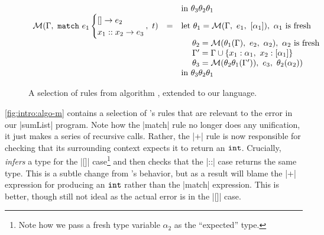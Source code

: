 \begin{figure}
\[{\begin{array}{lcl}
   &   & \text{in } \tsu_3\tsu_2\tsu_1 \\
\M(\Gamma,\ \elcase{e_1}{e_2}{x_1}{x_2}{e_3},\ t)
   & = & \text{let } \tsu_1 = \M(\Gamma,\ e_1,\ \tlist{\alpha_1}),\ \alpha_1 \text{ is fresh} \\
   &   & \quad\ \tsu_2 = \M(\tsu_1(\Gamma),\ e_2,\ \alpha_2),\ \alpha_2 \text{ is fresh} \\
   &   & \quad\ \Gamma' = \Gamma \cup \{x_1:\alpha_1,\ x_2:\tlist{\alpha_1}\} \\
   &   & \quad\ \tsu_3 = \M(\tsu_2\tsu_1(\Gamma')),\ e_3,\ \tsu_2(\alpha_2)) \\
   &   & \text{in } \tsu_3\tsu_2\tsu_1 \\
\end{array}
}
\]
\caption{A selection of rules from algorithm \M, extended to our language.}
\label{fig:intro:algo-m}
\end{figure}

\autoref{fig:intro:algo-m} contains a selection of \M's rules that are relevant to the error in our |sumList| program.
%
Note how the |match| rule no longer does any unification, it just makes
a series of recursive calls.
%
Rather, the |+| rule is now responsible for checking that its
surrounding context expects it to return an $\mathtt{int}$.
%
Crucially, \M \emph{infers} a type for the |[]| case\footnote{Note how
  we pass a fresh type variable $\alpha_2$ as the ``expected'' type.}
and then checks that the |::| case returns the same type.
%
This is a subtle change from \W's behavior, but as a result \M will
blame the |+| expression for producing an $\mathtt{int}$ rather than the
|match| expression.
%
This is better, though still not ideal as the actual error is in the
|[]| case.

%

